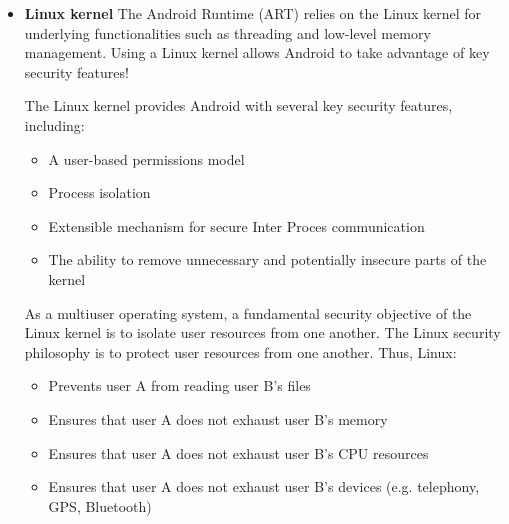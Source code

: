 \begin{itemize}
	\item \textbf{Linux kernel} The Android Runtime (ART) relies on the Linux kernel for underlying functionalities such as threading and low-level memory management.
	Using a Linux kernel allows Android to take advantage of key security features!
	
	The Linux kernel provides Android with several key security features, including:
	
	\begin{itemize}
		\item A user-based permissions model
		\item Process isolation
		\item Extensible mechanism for secure Inter Proces communication
		\item The ability to remove unnecessary and potentially insecure parts of the kernel
	\end{itemize}
	As a multiuser operating system, a fundamental security objective of the Linux kernel is to isolate user resources from one another.
	The Linux security philosophy is to protect user resources from one another.
	Thus, Linux:	
	\begin{itemize}
		\item Prevents user A from reading user B's files
		\item Ensures that user A does not exhaust user B's memory
		\item Ensures that user A does not exhaust user B's CPU resources
		\item Ensures that user A does not exhaust user B's devices (e.g. telephony, GPS, Bluetooth)
	\end{itemize}
		

\end{itemize}
